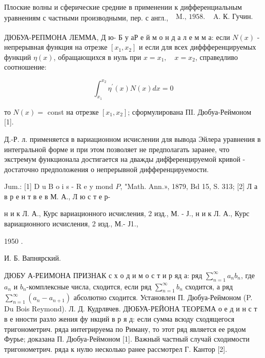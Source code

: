 \documentclass[10pt]{article}
\begin{document}
Плоские волны и сферические средние в применении к дифференциальным уравнениям с частными производными, пер. с англ., $\begin{array}{ll}\text { M., } 1958 . & \text { A. К. Гучин. } \\ & \end{array}$



ДЮБУА-РЕПМОНА ЛЕММА, Д ю- Б у аР е й м о н д а л е м м а: если $N(x)$ - непрерывная функция на отрезке $\left[x_{1}, x_{2}\right]$ и если для всех диффференцируемых функций $\eta(x)$, обращающихся в нуль при $x=x_{1}, \quad x=x_{2}$, справедливо соотношение:



\[

\int_{x_{1}}^{x_{2}} \eta^{\prime}(x) N(x) d x=0

\]



то $N(x)=$ const на отрезке $\left[x_{1}, x_{2}\right]$; сформулирована ПI. Дюбуа-Реймоном [1].



Д.-Р. л. применяется в вариационном исчислении для вывода Эйлера уравнения в интегральной форме и при этом позволяет не предполагать заранее, что экстремум функционала достигается на дважды диф̆ференцируемой кривой - достаточно предположения о непрерывной дифференцируемости.



Jum.: [1] D u B o i s - R e y mond $P$, "Math. Ann.», 1879, Bd 15, S. 313; [2] Л а в р е н т в е в М. А., Л ю с т е р-

н и к Л. А., Курс вариационного исчисления, 2 изд., М. - Ј., н и к Л. А., Курс вариационного исчисления, 2 изд., М.- Ј1.,

1950 .

И. Б. Вапнярский.



ДЮБУ А-РЕИМОНА ПРИЗНАК с х о д и м о с т и р яд а: ряд $\sum_{n=1}^{\infty} a_{n} b_{n}$, где $a_{n}$ и $b_{n}$-комплексные числа, сходится, если ряд $\sum_{n=1}^{\infty} b_{n}$ сходится, а ряд $\sum_{n=1}^{\infty}\left(a_{n}-a_{n+1}\right)$ абсолютно сходится. Установлен П. Дюбуа-Реймоном (P. Du Bois Reymond). Л. Д. Кудрлвчев. ДЮБУА-РЕЙОНА ТЕОРЕМА о е д и н с т в е нности разло жения фу нкций в р я д: если сумма всюду сходящегося тригонометрич. ряда интегрируема по Риману, то этот ряд является ее рядом Фурье; доказана П. Дюбуа-Реймоном [1]. Важный частный случай сходимости тригонометрич. ряда к нулю несколько ранее рассмотрел Г. Кантор [2].
\end{document}
